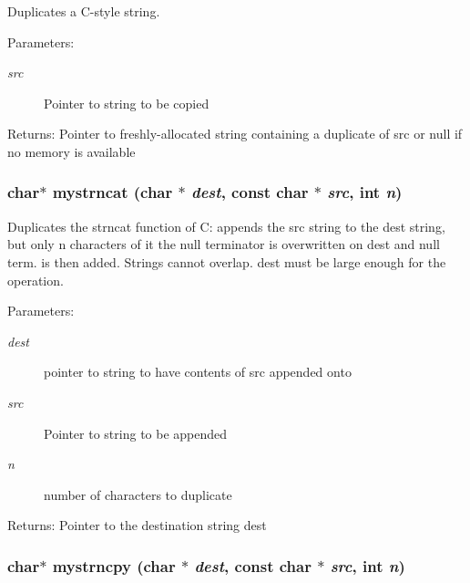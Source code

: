 Duplicates a C-style string. \begin{Desc}
\item[Parameters:]
\begin{description}
\item[{\em src}]Pointer to string to be copied \end{description}
\end{Desc}
\begin{Desc}
\item[Returns:]Pointer to freshly-allocated string containing a duplicate of src or null if no memory is available \end{Desc}
\subsubsection{\setlength{\rightskip}{0pt plus 5cm}char$\ast$ mystrncat (char $\ast$ {\em dest}, const char $\ast$ {\em src}, int {\em n})}\label{mystring_8h_5118ef3a602744c5ee61e5b366cb3a02}


Duplicates the strncat function of C: appends the src string to the dest string, but only n characters of it the null terminator is overwritten on dest and null term. is then added. Strings cannot overlap. dest must be large enough for the operation. \begin{Desc}
\item[Parameters:]
\begin{description}
\item[{\em dest}]pointer to string to have contents of src appended onto \item[{\em src}]Pointer to string to be appended \item[{\em n}]number of characters to duplicate \end{description}
\end{Desc}
\begin{Desc}
\item[Returns:]Pointer to the destination string dest \end{Desc}
\subsubsection{\setlength{\rightskip}{0pt plus 5cm}char$\ast$ mystrncpy (char $\ast$ {\em dest}, const char $\ast$ {\em src}, int {\em n})}\label{mystring_8h_90a633351ed616644738f44135441ca9}


